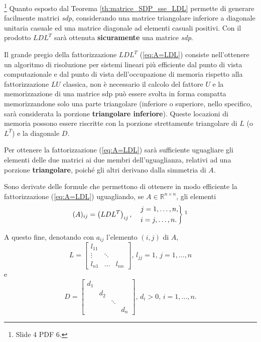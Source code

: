 \begin{remark}\footnote{Slide 4 PDF 6.}
    Quanto esposto dal Teorema \ref{th:matrice_SDP_sse_LDL} permette di generare facilmente matrici \textit{sdp}, considerando una matrice triangolare inferiore a diagonale unitaria casuale ed una matrice diagonale ad elementi casuali positivi.
    Con il prodotto $LDL^T$ sarà ottenuta \textbf{sicuramente} una matrice \textit{sdp}.
\end{remark}

Il grande pregio della fattorizzazione $LDL^T$ (\ref{eq:A=LDL}) consiste nell'ottenere un algoritmo di risoluzione per sistemi lineari più efficiente dal punto di vista computazionale e dal punto di vista dell'occupazione di memoria rispetto alla fattorizzazione $LU$ classica, non è necessario il calcolo del fattore $U$ e la memorizzazione di una matrice sdp può essere svolta in forma compatta memorizzandone solo una parte triangolare (inferiore o superiore, nello specifico, sarà considerata la porzione \textbf{triangolare inferiore}). Queste locazioni di memoria possono essere riscritte con la porzione strettamente triangolare di $L$ (o $L^T$) e la diagonale $D$.

Per ottenere la fattorizzazione (\ref{eq:A=LDL}) sarà sufficiente uguagliare gli elementi delle due matrici ai due membri dell'uguaglianza, relativi ad una porzione \textbf{triangolare}, poiché gli altri derivano dalla simmetria di $A$.

Sono derivate delle formule che permettono di ottenere in modo efficiente la fattorizzazione (\ref{eq:A=LDL}) uguagliando, se $A\in \mathbb R^{n\times n}$, gli elementi
\begin{equation*}
    (A)_{ij}=\left(LDL^T\right)_{ij},\quad\begin{rcases}
         j=1,\hdots,n,\\
         i=j,\hdots, n.
    \end{rcases}\footnotemark
\end{equation*}

A questo fine, denotando con $a_{ij}$ l'elemento $(i,j)$ di $A$,
\begin{equation*}
    L = 
    \begin{bmatrix}
        l_{11}\\
        \vdots & \ddots\\
        l_{n1} &\hdots & l_{nn}
    \end{bmatrix},\, 
    l_{jj}=1,\,j=1,\hdots, n
\end{equation*}
e
\begin{equation*}
    D=
    \begin{bmatrix}
        d_1\\
        & d_2\\
        & & \ddots\\
        & & & d_n
    \end{bmatrix},\,
        d_i>0,\,i=1,\hdots, n.
\end{equation*}

